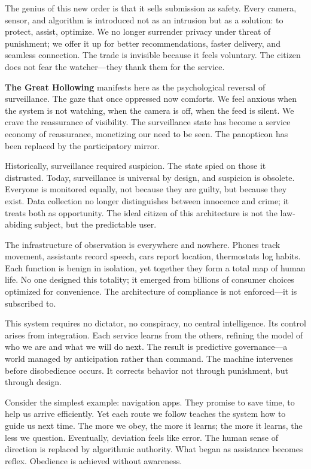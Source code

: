 \documentclass[11pt,twoside]{book}
\begin{document}
The genius of this new order is that it sells submission as safety.  Every camera, sensor, and algorithm is introduced not as an intrusion but as a solution: to protect, assist, optimize.  We no longer surrender privacy under threat of punishment; we offer it up for better recommendations, faster delivery, and seamless connection.  The trade is invisible because it feels voluntary.  The citizen does not fear the watcher—they thank them for the service.

\textbf{The Great Hollowing} manifests here as the psychological reversal of surveillance.  The gaze that once oppressed now comforts.  We feel anxious when the system is not watching, when the camera is off, when the feed is silent.  We crave the reassurance of visibility.  The surveillance state has become a service economy of reassurance, monetizing our need to be seen.  The panopticon has been replaced by the participatory mirror.

Historically, surveillance required suspicion.  The state spied on those it distrusted.  Today, surveillance is universal by design, and suspicion is obsolete.  Everyone is monitored equally, not because they are guilty, but because they exist.  Data collection no longer distinguishes between innocence and crime; it treats both as opportunity.  The ideal citizen of this architecture is not the law-abiding subject, but the predictable user.

The infrastructure of observation is everywhere and nowhere.  Phones track movement, assistants record speech, cars report location, thermostats log habits.  Each function is benign in isolation, yet together they form a total map of human life.  No one designed this totality; it emerged from billions of consumer choices optimized for convenience.  The architecture of compliance is not enforced—it is subscribed to.

This system requires no dictator, no conspiracy, no central intelligence.  Its control arises from integration.  Each service learns from the others, refining the model of who we are and what we will do next.  The result is predictive governance—a world managed by anticipation rather than command.  The machine intervenes before disobedience occurs.  It corrects behavior not through punishment, but through design.

Consider the simplest example: navigation apps.  They promise to save time, to help us arrive efficiently.  Yet each route we follow teaches the system how to guide us next time.  The more we obey, the more it learns; the more it learns, the less we question.  Eventually, deviation feels like error.  The human sense of direction is replaced by algorithmic authority.  What began as assistance becomes reflex.  Obedience is achieved without awareness.
\end{document}
